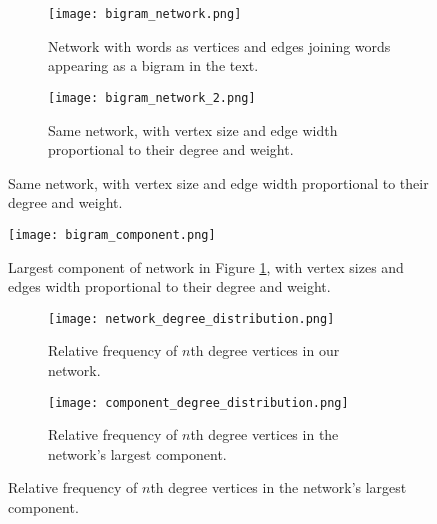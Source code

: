 \documentclass[letterpaper, 10 pt, conference]{article}
\begin{document}
\begin{figure}
	\centering
	\caption{Book network representation.} 
	\begin{subfigure}{0.45\linewidth}
		\caption{Network with words as vertices and edges joining words appearing as a bigram in the text.}
		\texttt{[image: bigram\_network.png]}
	\end{subfigure}
	\hfill
	\begin{subfigure}{0.45\linewidth}
		\caption{Same network, with vertex size and edge width proportional to their degree and weight.}
		\texttt{[image: bigram\_network\_2.png]}
	\end{subfigure}
	\label{fig:network}
\end{figure}


\begin{figure}
	\centering
	\caption{Largest component of network in Figure \ref{fig:network}, with vertex sizes and edges width proportional to their degree and weight.}
		\texttt{[image: bigram\_component.png]}
	\label{fig:component}
\end{figure}

\begin{figure}
	\centering
	\caption{Degree distributions.} 
	\begin{subfigure}{0.45\linewidth}
		\caption{Relative frequency of $n$th degree vertices in our network.}
		\texttt{[image: network\_degree\_distribution.png]}
	\end{subfigure}
	\hfill
	\begin{subfigure}{0.45\linewidth}
		\caption{Relative frequency of $n$th degree vertices in the network's largest component.}
		\texttt{[image: component\_degree\_distribution.png]}
	\end{subfigure}
	\label{fig:degree_distribution}
\end{figure}
\end{document}
